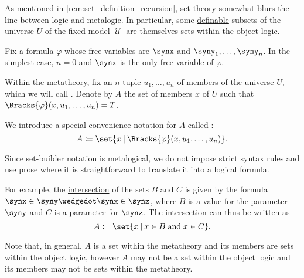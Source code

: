 \begin{definition}\label{def:set_builder_notation}\mimprovised
  As mentioned in \cref{rem:set_definition_recursion}, set theory somewhat blurs the line between logic and metalogic. In particular, some \hyperref[def:first_order_definability]{definable} subsets of the universe \( U \) of the fixed model \( \mscrU \) are themselves sets within the object logic.

  Fix a formula \( \varphi \) whose free variables are \( \synx \) and \( \syny_1, \ldots, \syny_n \). In the simplest case, \( n = 0 \) and \( \synx \) is the only free variable of \( \varphi \).

  Within the metatheory, fix an \( n \)-tuple \( u_1, \ldots, u_n \) of members of the universe \( U \), which we will call . Denote by \( A \) the set of members \( x \) of \( U \) such that \( \Bracks{\varphi}(x, u_1, \ldots, u_n) = T \).

  We introduce a special convenience notation for \( A \) called :
  \begin{equation*}
    A \coloneqq \set{ x \given \Bracks{\varphi}(x, u_1, \ldots, u_n) }.
  \end{equation*}

  Since set-builder notation is metalogical, we do not impose strict syntax rules and use prose where it is straightforward to translate it into a logical formula.

  For example, the \hyperref[def:basic_set_operations/intersection]{intersection} of the sets \( B \) and \( C \) is given by the formula \( \synx \in \syny \synwedge \synx \in \synz \), where \( B \) is a value for the parameter \( \syny \) and \( C \) is a parameter for \( \synz \). The intersection can thus be written as
  \begin{equation*}
    A \coloneqq \set{ x \given x \in B \T{and} x \in C }.
  \end{equation*}

  Note that, in general, \( A \) is a set within the metatheory and its members are sets within the object logic, however \( A \) may not be a set within the object logic and its members may not be sets within the metatheory.


\end{definition}

